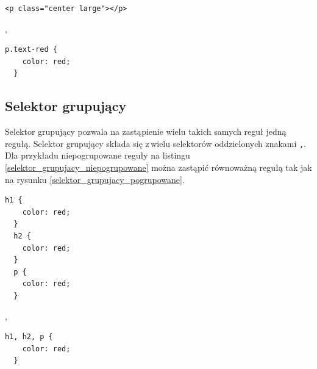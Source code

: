 \documentclass[a4paper,12pt]{book} %
\begin{document}
\begin{lstfloat}[hb]
  \lstset{language=HTML}
  \begin{lstlisting}[frame=single]
  <p class="center large"></p>\end{lstlisting}
  \caption{Element HTML z dwiema klasami},
  \label{wiele_klas}
\end{lstfloat}

\begin{lstfloat}[hb]
  \lstset{language=HTML}
  \begin{lstlisting}[frame=single]
  p.text-red {
    color: red;
  }\end{lstlisting}
  \caption{Reguła z selektorem akapitów o\,atrybucie \lstinline{class="text-red"}}\label{selektor_elementu_i_klas}
\end{lstfloat}


\clearpage
\subsection{Selektor grupujący}
Selektor grupujący pozwala na zastąpienie wielu takich samych reguł jedną regułą. Selektor grupujący składa się z\,wielu selektorów oddzielonych znakami \lstinline|,|.
Dla przykładu niepogrupowane reguły na listingu \ref{selektor_grupujacy_niepogrupowane} można zastąpić równoważną regułą tak jak na rysunku \ref{selektor_grupujacy_pogrupowane}.



\begin{lstfloat}[hb]
  \lstset{language=HTML}
  \begin{lstlisting}[frame=single]
  h1 {
    color: red;
  }
  h2 {
    color: red;
  }
  p {
    color: red;
  }\end{lstlisting}

  \caption{Niepogrupowane reguły},
  \label{selektor_grupujacy_niepogrupowane}

\end{lstfloat}




\begin{lstfloat}[hb]
  \lstset{language=HTML}
  \begin{lstlisting}[frame=single]
  h1, h2, p {
    color: red;
  }\end{lstlisting}

  \caption{Pogrupowane reguły}
  \label{selektor_grupujacy_pogrupowane}

\end{lstfloat}
\end{document}
